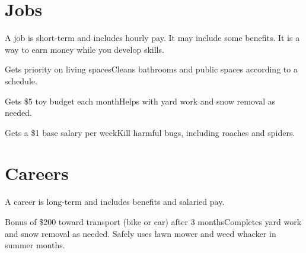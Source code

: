 \chapter{Jobs}

A job is short-term and includes hourly pay. It may include some benefits. It is a way to earn money while you develop skills.


	{Gets priority on living spaces}{Cleans bathrooms and public spaces according to a schedule.}

	{Gets \$5 toy budget each month}{Helps with yard work and snow removal as needed.}

	{Gets a \$1 base salary per week}{Kill harmful bugs, including roaches and spiders.}


\chapter{Careers}

A career is long-term and includes benefits and salaried pay.

	{Bonus of \$200 toward transport (bike or car) after 3 months}{Completes yard work and snow removal as needed. Safely uses lawn mower and weed whacker in summer months.}

